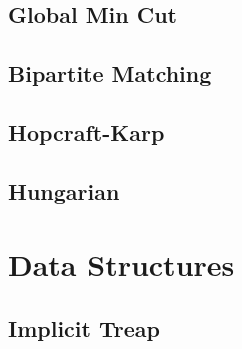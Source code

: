 \subsection{	Global Min Cut}
\raggedbottom
\hrulefill
\subsection{Bipartite Matching}
\raggedbottom
\hrulefill
\subsection{	Hopcraft-Karp}
\raggedbottom
\hrulefill
\subsection{Hungarian}
\raggedbottom
\hrulefill

\section{Data Structures}
\subsection{Implicit Treap}
\raggedbottom
\hrulefill

